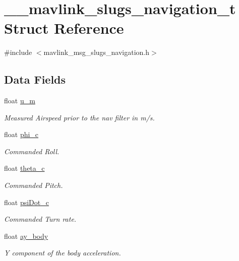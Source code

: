 \hypertarget{struct____mavlink__slugs__navigation__t}{\section{\+\_\+\+\_\+mavlink\+\_\+slugs\+\_\+navigation\+\_\+t Struct Reference}
\label{struct____mavlink__slugs__navigation__t}
}


{\ttfamily \#include $<$mavlink\+\_\+msg\+\_\+slugs\+\_\+navigation.\+h$>$}

\subsection*{Data Fields}
\begin{DoxyCompactItemize}
\item 
float \hyperlink{struct____mavlink__slugs__navigation__t_ab02b3924eade172ebf26b5c13808a5e7}{u\+\_\+m}
\begin{DoxyCompactList}\small\item\em Measured Airspeed prior to the nav filter in m/s. \end{DoxyCompactList}\item 
float \hyperlink{struct____mavlink__slugs__navigation__t_a3660fd636496c1bda23212f10b2095c9}{phi\+\_\+c}
\begin{DoxyCompactList}\small\item\em Commanded Roll. \end{DoxyCompactList}\item 
float \hyperlink{struct____mavlink__slugs__navigation__t_a6c0f3c6f097472d50925ec77ab63e46b}{theta\+\_\+c}
\begin{DoxyCompactList}\small\item\em Commanded Pitch. \end{DoxyCompactList}\item 
float \hyperlink{struct____mavlink__slugs__navigation__t_a2434700ae9d16a4e75617351023b53ba}{psi\+Dot\+\_\+c}
\begin{DoxyCompactList}\small\item\em Commanded Turn rate. \end{DoxyCompactList}\item 
float \hyperlink{struct____mavlink__slugs__navigation__t_a0d4a61770f5b61d3f19fcaf3380db8f3}{ay\+\_\+body}
\begin{DoxyCompactList}\small\item\em Y component of the body acceleration. \end{DoxyCompactList}\item 

\end{DoxyCompactItemize}
